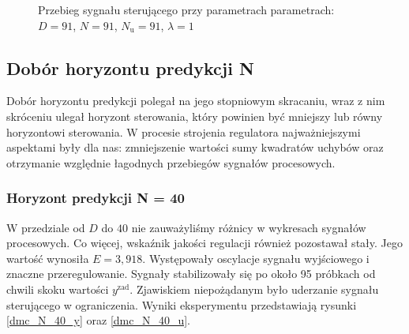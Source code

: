 \begin{figure}[b]
    \centering
    \caption{Przebieg sygnału sterującego przy parametrach parametrach: $D = 91$, $N = 91$, $N_{\mathrm{u}} = 91$, $\lambda = 1$}
    \label{dmc_start_ster}
\end{figure}
\FloatBarrier

\subsection{Dobór horyzontu predykcji N}
\label{zad_dobor_N}
Dobór horyzontu predykcji polegał na jego stopniowym skracaniu, wraz z nim skróceniu ulegał horyzont sterowania, który powinien być mniejszy lub równy horyzontowi sterowania. W procesie strojenia regulatora najważniejszymi aspektami były dla nas: zmniejszenie wartości sumy kwadratów uchybów oraz otrzymanie względnie łagodnych przebiegów sygnałów procesowych.

\subsubsection{Horyzont predykcji N = 40}
W przedziale od $D$ do $40$ nie zauważyliśmy różnicy w wykresach sygnałów procesowych. Co więcej, wskaźnik jakości regulacji również pozostawał stały. Jego wartość wynosiła $E = 3,918$. Występowały oscylacje sygnału wyjściowego i znaczne przeregulowanie. Sygnały stabilizowały się po około 95 próbkach od chwili skoku wartości $y^{\mathrm{zad}}$. Zjawiskiem niepożądanym było uderzanie sygnału sterującego w ograniczenia. Wyniki eksperymentu przedstawiają rysunki \ref{dmc_N_40_y} oraz \ref{dmc_N_40_u}.

